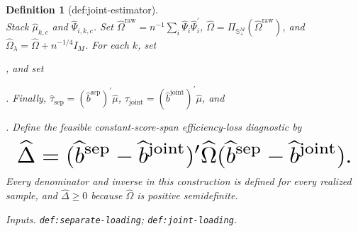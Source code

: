\documentclass{article}
\newtheorem{definition}{Definition}
\begin{document}
\begin{definition}[def:joint-estimator]
\[\] Stack \(\widehat\mu_{k,c}\) and \(\widehat\Psi_{i,k,c}\). Set \(\widehat\Omega^{\mathrm{raw}}=n^{-1}\sum_i\widehat\Psi_i\widehat\Psi_i^{\prime}\), \(\widehat\Omega=\Pi_{\mathbb S_+^M}(\widehat\Omega^{\mathrm{raw}})\), and \(\widehat\Omega_\lambda=\widehat\Omega+n^{-1/4}I_M\). For each \(k\), set \leavevmode\par\noindent {}\par\noindent, and set \leavevmode\par\noindent {}\par\noindent. Finally, \(\widehat\tau_{\mathrm{sep}}=(\widehat b^{\mathrm{sep}})^{\prime}\widehat\mu\), \(\widehat\tau_{\mathrm{joint}}=(\widehat b^{\mathrm{joint}})^{\prime}\widehat\mu\), and \leavevmode\par\noindent {}\par\noindent. Define the feasible constant-score-span efficiency-loss diagnostic by
\[
\makebox[\linewidth][c]{\resizebox{0.98\linewidth}{!}{\(\displaystyle \widehat\Delta=(\widehat b^{\mathrm{sep}}-\widehat b^{\mathrm{joint}})^{\prime}
\widehat\Omega
(\widehat b^{\mathrm{sep}}-\widehat b^{\mathrm{joint}}).\)}}
\]
Every denominator and inverse in this construction is defined for every realized sample, and \(\widehat\Delta\ge0\) because \(\widehat\Omega\) is positive semidefinite.
\par\smallskip\noindent\emph{Inputs.} \texttt{def:\allowbreak{}separate-\allowbreak{}loading}; \texttt{def:\allowbreak{}joint-\allowbreak{}loading}.
\end{definition}
\end{document}
